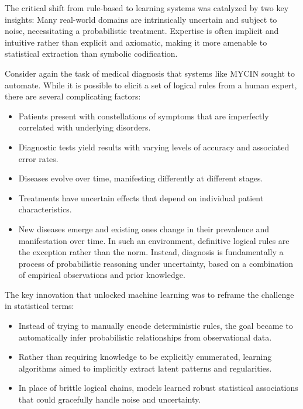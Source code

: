 \documentclass[
  9pt,
  letterpaper,
  abstract,
  titlepage]{scrbook}
\begin{document}
The critical shift from rule-based to learning systems was catalyzed by
two key insights: Many real-world domains are intrinsically uncertain
and subject to noise, necessitating a probabilistic treatment. Expertise
is often implicit and intuitive rather than explicit and axiomatic,
making it more amenable to statistical extraction than symbolic
codification.

Consider again the task of medical diagnosis that systems like MYCIN
sought to automate. While it is possible to elicit a set of logical
rules from a human expert, there are several complicating factors:

\begin{itemize}
\item
  Patients present with constellations of symptoms that are imperfectly
  correlated with underlying disorders.
\item
  Diagnostic tests yield results with varying levels of accuracy and
  associated error rates.
\item
  Diseases evolve over time, manifesting differently at different
  stages.
\item
  Treatments have uncertain effects that depend on individual patient
  characteristics.
\item
  New diseases emerge and existing ones change in their prevalence and
  manifestation over time. In such an environment, definitive logical
  rules are the exception rather than the norm. Instead, diagnosis is
  fundamentally a process of probabilistic reasoning under uncertainty,
  based on a combination of empirical observations and prior knowledge.
\end{itemize}

The key innovation that unlocked machine learning was to reframe the
challenge in statistical terms:

\begin{itemize}
\item
  Instead of trying to manually encode deterministic rules, the goal
  became to automatically infer probabilistic relationships from
  observational data.
\item
  Rather than requiring knowledge to be explicitly enumerated, learning
  algorithms aimed to implicitly extract latent patterns and
  regularities.
\item
  In place of brittle logical chains, models learned robust statistical
  associations that could gracefully handle noise and uncertainty.
\end{itemize}
\end{document}
